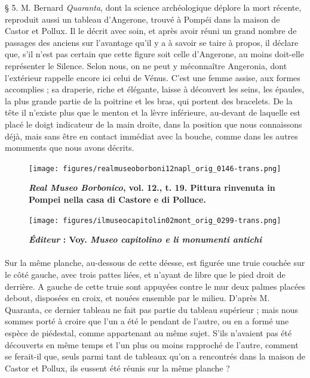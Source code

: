 \documentclass[a4paper, 11pt, oneside, polutonikogreek, french]{article}
\begin{document}
§ 5. M. Bernard \emph{Quaranta}, dont la science archéologique déplore la mort récente, reproduit aussi un tableau d'Angerone, trouvé à Pompéi dans la maison de Castor et Pollux. Il le décrit avec soin, et après avoir réuni un grand nombre de passages des anciens sur l'avantage qu'il y a à savoir se taire à propos, il déclare que, s'il n'est pas certain que cette figure soit celle d'Angerone, au moins doit-elle représenter le Silence. Selon nous, on ne peut y méconnaître Angeronia, dont l'extérieur rappelle encore ici celui de Vénus. C'est une femme assise, aux formes accomplies ; sa draperie, riche et élégante, laisse à découvert les seins, les épaules, la plus grande partie de la poitrine et les bras, qui portent des bracelets. De la tête il n'existe plus que le menton et la lèvre inférieure, au-devant de laquelle est placé le doigt indicateur de la main droite, dans la position que nous connaissons déjà, mais sans être en contact immédiat avec la bouche, comme dans les autres monuments que nous avons décrits.
\clearpage
\vspace*{\fill}
\begin{figure}[H]
\centering
\texttt{[image: figures/realmuseoborboni12napl\_orig\_0146-trans.png]}
\caption{\bfseries \emph{Real Museo Borbonico}, vol. 12., t. 19. Pittura rinvenuta in Pompei nella casa di Castore e di Polluce.}
\end{figure}
\vspace*{\fill}
\clearpage
\vspace*{\fill}
\begin{figure}[H]
\centering
\texttt{[image: figures/ilmuseocapitolin02mont\_orig\_0299-trans.png]}
\caption{\bfseries \emph{Éditeur} : Voy. \emph{Museo capitolino e li monumenti antichi}}
\end{figure}
\vspace*{\fill}
\clearpage
\paragraph{}
Sur la même planche, au-dessous de cette déesse, est figurée une truie couchée sur le côté gauche, avec trois pattes liées, et n'ayant de libre que le pied droit de derrière. A gauche de cette truie sont appuyées contre le mur deux palmes placées debout, disposées en croix, et nouées ensemble par le milieu. D'après M. Quaranta, ce dernier tableau ne fait pas partie du tableau supérieur ; mais nous sommes porté à croire que l'un a été le pendant de l'autre, ou en a formé une espèce de piédestal, comme appartenant au même sujet. S'ils n'avaient pas été découverts en même temps et l'un plus ou moins rapproché de l'autre, comment se ferait-il que, seuls parmi tant de tableaux qu'on a rencontrés dans la maison de Castor et Pollux, ils eussent été réunis sur la même planche ?
\end{document}
